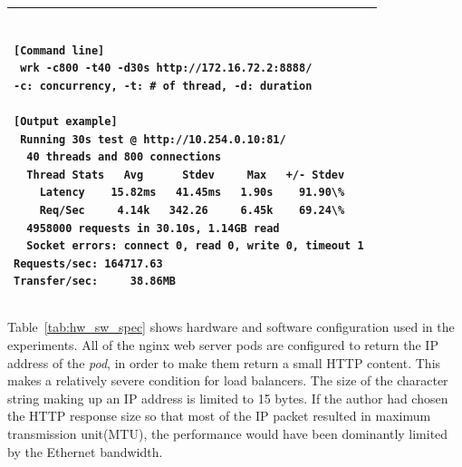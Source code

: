 \begin{table}[h]
  \centering
  \begin{tabular}{l}
    \hline
    \begin{minipage}{13cm}
      \begin{verbatim}

[Command line] 
 wrk -c800 -t40 -d30s http://172.16.72.2:8888/ 
-c: concurrency, -t: # of thread, -d: duration 

[Output example] 
 Running 30s test @ http://10.254.0.10:81/ 
  40 threads and 800 connections 
  Thread Stats   Avg      Stdev     Max   +/- Stdev 
    Latency    15.82ms   41.45ms   1.90s    91.90\% 
    Req/Sec     4.14k   342.26     6.45k    69.24\% 
  4958000 requests in 30.10s, 1.14GB read 
  Socket errors: connect 0, read 0, write 0, timeout 1 
Requests/sec: 164717.63 
Transfer/sec:     38.86MB 
      \end{verbatim}
    \end{minipage}
   \\ \hline
  \end{tabular}
  \caption{}
  \label{tab:bench_example}
\end{table}

Table~\ref{tab:hw_sw_spec} shows hardware and software configuration used in the experiments.
All of the nginx web server pods are configured to return the IP address of the {\em pod}, in order to make them return a small HTTP content. This makes a relatively severe condition for load balancers. 
The size of the character string making up an IP address is limited to 15 bytes.
If the author had chosen the HTTP response size so that most of the IP packet resulted in maximum transmission unit(MTU), the performance would have been dominantly limited by the Ethernet bandwidth.

